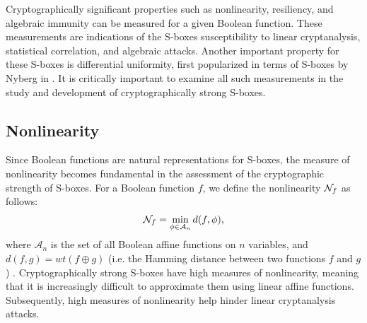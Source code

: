 Cryptographically significant properties such as nonlinearity, resiliency, and algebraic immunity 
can be measured for a given Boolean function. These measurements are indications of the 
S-boxes susceptibility to linear cryptanalysis, statistical correlation, and algebraic attacks.
Another important property for these S-boxes is differential uniformity, first popularized in
terms of S-boxes by Nyberg in \cite{Nyberg94-1}. It is critically important to examine all
such measurements in the study and development of cryptographically strong S-boxes.


\subsection{Nonlinearity}
Since Boolean functions are natural representations for S-boxes, the measure of nonlinearity becomes
fundamental in the assessment of the cryptographic strength of S-boxes. For a Boolean function $f$,
we define the nonlinearity $\mathcal{N}_{f}$ as follows:
\begin{align*}
\mathcal{N}_{f} = \min_{\phi \in \mathcal{A}_n} d(f, \phi),
\end{align*}
where $\mathcal{A}_n$ is the set of all Boolean affine functions on $n$ variables, 
and $d(f, g) = wt(f \oplus g)$ (i.e. the Hamming distance between two functions $f$ and $g$) \cite{Cusik09-1}. 
Cryptographically strong S-boxes have high measures of nonlinearity, meaning that
it is increasingly difficult to approximate them using linear affine functions.
Subsequently, high measures of nonlinearity help hinder linear cryptanalysis attacks. 

